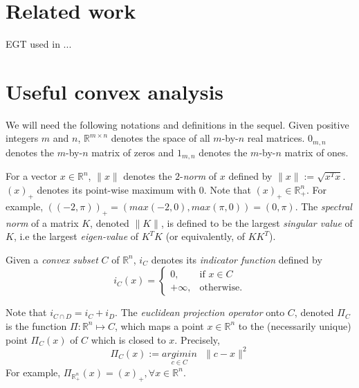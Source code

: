 \documentclass{article} %
\begin{document}

\section{Related work}
\label{sec:related_work}
EGT used in \cite{hoda2010smoothing}...

\section{Useful convex analysis}
\label{sec:notation}
We will need the following notations and definitions in the sequel. Given positive integers $m$ and $n$, $\mathbb{R}^{m \times n}$ denotes
the space of all $m$-by-$n$ real matrices. $0_{m,n}$ denotes the $m$-by-$n$ matrix of zeros and $1_{m,n}$ denotes the $m$-by-$n$ matrix of ones.

For a vector $x \in \mathbb{R}^n$, $\|x\|$ denotes the $2$-\textit{norm} of $x$ defined by $\|x\| := \sqrt{x^Tx}$.
$(x)_+$ denotes its point-wise maximum with 0. Note that $(x)_+ \in \mathbb{R}^n_+$.
For example, $((-2, \pi))_+ = (max(-2, 0), max(\pi, 0)) = (0, \pi)$. The \textit{spectral norm} of a matrix $K$,
denoted $\|K\|$, is defined to be the largest \textit{singular value} of $K$, i.e the largest \textit{eigen-value} of $K^TK$ (or equivalently, of $KK^T$).

Given a \textit{convex subset} $C$ of $\mathbb{R}^n$, $i_C$ denotes its \textit{indicator function} defined by
\begin{equation}
  i_C(x) = \begin{cases}
    0, &\mbox{if } x \in C\\
    +\infty, &\mbox{otherwise}.
    \end{cases}
  \end{equation}

Note that $i_{C \cap D} = i_C + i_D$. The \textit{euclidean projection operator} onto $C$, denoted $\Pi_C$ is the function
$\Pi: \mathbb{R}^n \mapsto C$, which maps a point $x \in \mathbb{R}^n$ to the (necessarily unique) point $\Pi_C(x)$ of $C$ which is closed to $x$. Precisely,
\begin{equation}
  \Pi_C(x) := \underset{c \in C}{argimin}\text{ }\|c - x\|^2
\end{equation}
For example, $\Pi_{\mathbb{R}^n_+}(x) = (x)_+, \forall x \in \mathbb{R}^n$.
\end{document}
